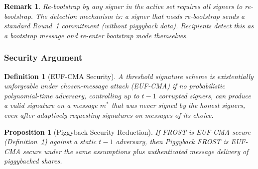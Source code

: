 \documentclass[11pt,a4paper]{article}
\newtheorem{definition}{Definition}[section]
\newtheorem{proposition}[theorem]{Proposition}
\newtheorem{remark}{Remark}[section]
\begin{document}
\begin{remark}
  Re-bootstrap by \emph{any} signer in the active set requires \emph{all}
  signers to re-bootstrap.  The detection mechanism is: a signer that needs
  re-bootstrap sends a standard Round~1 commitment (without piggyback
  data).  Recipients detect this as a bootstrap message and re-enter
  bootstrap mode themselves.
\end{remark}

\subsubsection{Security Argument}
\label{sec:piggyback-security}

\begin{definition}[EUF-CMA Security]
  \label{def:euf-cma}
  A threshold signature scheme is \emph{existentially unforgeable under
  chosen-message attack} (EUF-CMA) if no probabilistic polynomial-time
  adversary, controlling up to $t{-}1$ corrupted signers, can produce a valid
  signature on a message $m^*$ that was never signed by the honest signers,
  even after adaptively requesting signatures on messages of its choice.
\end{definition}

\begin{proposition}[Piggyback Security Reduction]
  \label{prop:piggyback-security}
  If FROST is EUF-CMA secure (Definition~\ref{def:euf-cma}) against a static
  $t{-}1$ adversary, then Piggyback FROST is EUF-CMA secure under the same
  assumptions plus authenticated message delivery of piggybacked shares.
\end{proposition}
\end{document}
